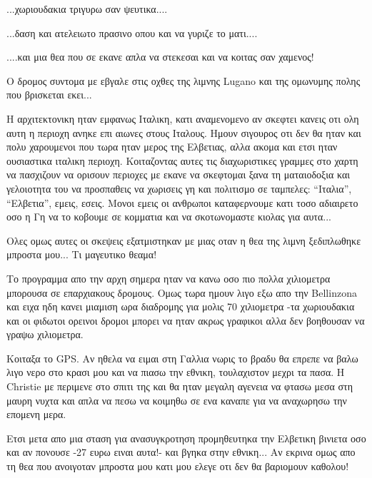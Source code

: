 
...χωριουδακια τριγυρω σαν ψευτικα....


...δαση και ατελειωτο πρασινο οπου και να γυριζε το ματι....


....και μια θεα που σε εκανε απλα να στεκεσαι και να κοιτας σαν χαμενος!


Ο δρομος συντομα με εβγαλε στις οχθες της λιμνης Lugano και της ομωνυμης πολης που βρισκεται εκει...


Η αρχιτεκτονικη ηταν εμφανως Ιταλικη, κατι αναμενομενο αν σκεφτει κανεις οτι ολη αυτη η περιοχη ανηκε επι αιωνες στους Ιταλους. Ημουν σιγουρος οτι δεν θα ηταν και πολυ χαρουμενοι που τωρα ηταν μερος της Ελβετιας, αλλα ακομα και ετσι ηταν ουσιαστικα ιταλικη περιοχη. 
Κοιταζοντας αυτες τις διαχωριστικες γραμμες στο χαρτη να πασχιζουν να ορισουν περιοχες με εκανε να σκεφτομαι ξανα τη ματαιοδοξια και γελοιοτητα του να προσπαθεις να χωρισεις γη και πολιτισμο σε ταμπελες: ``Ιταλια'', ``Ελβετια'', εμεις, εσεις. Μονοι εμεις οι ανθρωποι καταφερνουμε κατι τοσο αδιαιρετο οσο η Γη να το κοβουμε σε κομματια και να σκοτωνομαστε κιολας για αυτα...


Ολες ομως αυτες οι σκεψεις εξατμιστηκαν με μιας οταν η θεα της λιμνη ξεδιπλωθηκε μπροστα μου... 
Τι μαγευτικο θεαμα!


Το προγραμμα απο την αρχη σημερα ηταν να κανω οσο πιο πολλα χιλιομετρα μπορουσα σε επαρχιακους δρομους. 
Ομως τωρα ημουν λιγο εξω απο την Bellinzona και ειχα ηδη κανει μιαμιση ωρα διαδρομης για μολις 70 χιλιομετρα -τα χωριουδακια και οι φιδωτοι ορεινοι δρομοι μπορει να ηταν ακρως γραφικοι αλλα δεν βοηθουσαν να γραψω χιλιομετρα.


Κοιταξα το GPS. Αν ηθελα να ειμαι στη Γαλλια νωρις το βραδυ θα επρεπε να βαλω λιγο νερο στο κρασι μου και να πιασω την εθνικη, τουλαχιστον μεχρι τα πασα. Η Christie με περιμενε στο σπιτι της και θα ηταν μεγαλη αγενεια να φτασω μεσα στη μαυρη νυχτα και απλα να πεσω να κοιμηθω σε ενα καναπε για να αναχωρησω την επομενη μερα.

Ετσι μετα απο μια σταση για ανασυγκροτηση προμηθευτηκα την Ελβετικη βινιετα οσο και αν πονουσε -27 ευρω ειναι αυτα!- και βγηκα στην εθνικη...
Αν εκρινα ομως απο τη θεα που ανοιγοταν μπροστα μου κατι μου ελεγε οτι δεν θα βαριομουν καθολου!

